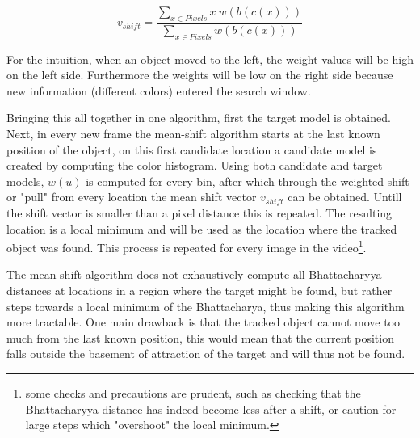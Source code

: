\documentclass[a4paper,11pt]{article}
\begin{document}
\begin{equation}

\label{eq:shift vector}

v_{shift}=\frac{\sum_{x\in Pixels} x \ w(b(c(x)))}{\sum_{x\in Pixels} w(b(c(x)))}

\end{equation} %

    

For the intuition, when an object moved to the left, the weight values will be high on the left side. Furthermore the weights will be low on the right side because new information (different colors) entered the search window. 

 

Bringing this all together in one algorithm, first the target model is obtained. Next, in every new frame the mean-shift algorithm starts at the last known position of the object, on this first candidate location a candidate model is created by computing the color histogram. Using both candidate and target models, $w(u)$ is computed for every bin, after which through the weighted shift or "pull" from every location the mean shift vector $v_{shift}$ can be obtained. Untill the shift vector is smaller than a pixel distance this is repeated. The resulting location is a local minimum and will be used as the location where the tracked object was found. This process is repeated for every image in the video\footnote{some checks and precautions are prudent, such as checking that the Bhattacharyya distance has indeed become less after a shift, or caution for large steps which "overshoot" the local minimum. }.



The mean-shift algorithm does not exhaustively compute all Bhattacharyya distances at locations in a region where the target might be found, but rather steps towards a local minimum of the Bhattacharya, thus making this algorithm more tractable. One main drawback is that the tracked object cannot move too much from the last known position, this would mean that the current position falls outside the basement of attraction of the target and will thus not be found. 







\end{document}
